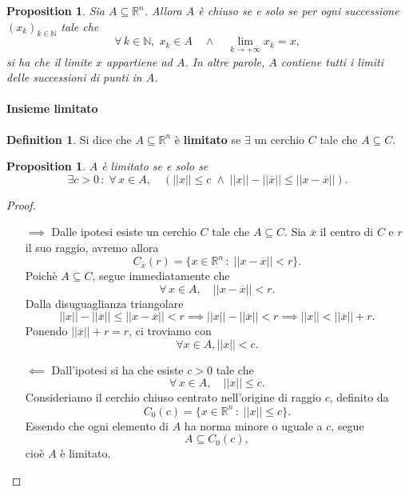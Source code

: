 \documentclass{article}
\theoremstyle{plain}
\newtheorem{prop}[thm]{Proposition}
\theoremstyle{definition}
\newtheorem{defn}{Definition}[section]
\theoremstyle{remark}
\begin{document}
\vspace{10pt}

\begin{bxthm}
\begin{prop}
Sia $A\subseteq\mathbb{R}^n$. Allora $A$ è chiuso se e solo se per ogni successione $(x_k)_{k\in\mathbb{N}}$ tale che 
\[
    \forall\, k\in\mathbb{N},\;x_k\in A \quad \land\quad \lim_{k\to+\infty} x_k = x,
\]
si ha che il limite $x$ appartiene ad $A$. In altre parole, $A$ contiene tutti i limiti delle successioni di punti in $A$.
\end{prop}
\end{bxthm}

\vspace{10pt}

\paragraph{Insieme limitato}
\begin{bxthm}
\begin{defn}
    Si dice che $A\subseteq\mathbb{R}^n$ è \textbf{limitato} se $\exists$ un cerchio $C$ tale che $A\subseteq C$.    
\end{defn}
\end{bxthm}

\vspace{10pt}

\begin{bxthm}
\begin{prop}
    $A$ è limitato se e solo se 
    \[\exists c>0 \,:\;\forall\,x\in A,\quad(||x||\leq c\;\land\; || x ||-|| \overline{x} ||\leq || x-\overline{x} ||).\]
\end{prop}
\end{bxthm}
\begin{proof}\hfill 
    \begin{itemize}
        \item[$\implies$] Dalle ipotesi esiste un cerchio $C$ tale che $A\subseteq C$. Sia $\overline{x}$ il centro di $C$ e $r$ il suo raggio, avremo allora 
        \[C_{\overline{x}}(r)=\{x\in\mathbb{R}^n\,:\;|| x-\overline{x} ||<r\}.\]
        Poichè $A\subseteq C$, segue immediatamente che 
        \[\forall\, x\in A,\quad || x-\overline{x} ||<r.\]
        Dalla disuguaglianza triangolare 
        \[|| x || -|| \overline{x} ||\leq|| x-\overline{x} ||<r \implies || x ||-|| \overline{x} ||<r \implies || x ||<|| \overline{x} ||+r.\]
        Ponendo $|| \overline{x} ||+r=r$, ci troviamo con 
        \[\forall x\in A, || x || < c.\]

        \item[$\impliedby$] Dall'ipotesi si ha che esiste $c>0$ tale che
        \[
        \forall\, x\in A,\quad ||x||\leq c.
        \]
        Consideriamo il cerchio chiuso centrato nell'origine di raggio $c$, definito da
        \[
        C_{0}(c)=\{x\in\mathbb{R}^n\,:\; ||x||\leq c\}.
        \]
        Essendo che ogni elemento di $A$ ha norma minore o uguale a $c$, segue 
        \[
        A\subseteq C_{0}(c),
        \]
        cioè $A$ è limitato.
    \end{itemize}
\end{proof}
\end{document}
